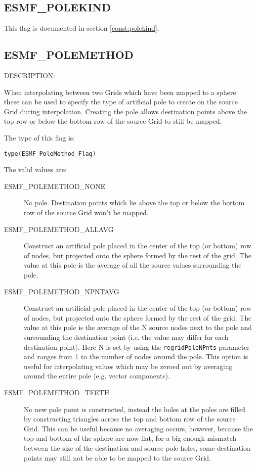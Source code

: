 \subsection{ESMF\_POLEKIND}
This flag is documented in section \ref{const:polekind}.

\subsection{ESMF\_POLEMETHOD}
\label{const:polemethod}

{\sf DESCRIPTION:\\}  
\begin{sloppypar}
When interpolating between two Grids which have been mapped to a sphere these can be used to specify the type of artificial pole to create on the source Grid during interpolation. Creating the pole allows destination points above the top row or below the bottom row of the source Grid to still be mapped.
\end{sloppypar}

The type of this flag is:

{\tt type(ESMF\_PoleMethod\_Flag)}

The valid values are:
\begin{description}
\item [ESMF\_POLEMETHOD\_NONE]
      No pole. Destination points which lie above the top or below the bottom row of the source Grid won't be mapped. 
\item [ESMF\_POLEMETHOD\_ALLAVG]
      Construct an artificial pole placed in the center of the top (or bottom) row of nodes, but projected onto the sphere formed by the rest of the grid. The value at this pole is the average of all the source values surrounding the pole.
\item [ESMF\_POLEMETHOD\_NPNTAVG] Construct an artificial pole placed in the center of the top (or bottom) row of nodes, but projected onto the sphere formed by the rest of the grid. The value at this pole is the average of the N source nodes next to the pole and surrounding the destination point (i.e. the value may differ for each destination point). Here N is set by using the {\tt regridPoleNPnts} parameter and ranges from 1 to the number of nodes around the pole. This option is useful for interpolating values which may be zeroed out by averaging around the entire pole (e.g. vector components). 
\item [ESMF\_POLEMETHOD\_TEETH]
    No new pole point is constructed, instead the holes at the poles are filled by constructing triangles across the top and bottom row of the source Grid. This can be useful because no averaging occurs, however, because the top and bottom of the sphere are now flat, for a big enough mismatch between the size of the destination and source pole holes, some destination points may still not be able to be mapped to the source Grid. 
\end{description}

